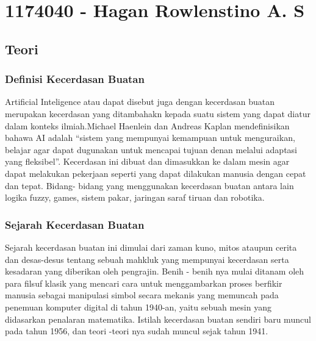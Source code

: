     \section{1174040 - Hagan Rowlenstino A. S}
        \subsection{Teori}
            \subsubsection{Definisi Kecerdasan Buatan}
            
            Artificial Inteligence atau dapat disebut juga dengan kecerdasan buatan merupakan kecerdasan yang ditambahakn kepada suatu sistem yang dapat diatur dalam konteks ilmiah.Michael Haenlein dan Andreas Kaplan mendefinisikan bahawa AI adalah “sistem yang mempunyai kemampuan untuk menguraikan, belajar agar dapat dugunakan untuk mencapai tujuan denan melalui adaptasi yang fleksibel”. Kecerdasan ini dibuat dan dimasukkan ke dalam mesin agar dapat melakukan pekerjaan seperti yang dapat dilakukan manusia dengan cepat dan tepat. Bidang- bidang yang menggunakan kecerdasan buatan antara lain logika fuzzy, games, sistem pakar, jaringan saraf tiruan dan robotika.
            
            \subsubsection{Sejarah Kecerdasan Buatan}
            
            Sejarah kecerdasan buatan ini dimulai dari zaman kuno, mitos ataupun cerita dan desas-desus tentang sebuah mahkluk yang mempunyai kecerdasan serta kesadaran yang diberikan oleh pengrajin. Benih - benih nya mulai ditanam oleh para filsuf klasik yang mencari cara untuk menggambarkan proses berfikir manusia sebagai manipulasi simbol secara mekanis yang memuncah pada penemuan komputer digital di tahun 1940-an, yaitu sebuah mesin yang didasarkan penalaran matematika. Istilah kecerdasan buatan sendiri baru muncul pada tahun 1956, dan teori -teori nya sudah muncul sejak tahun 1941.


